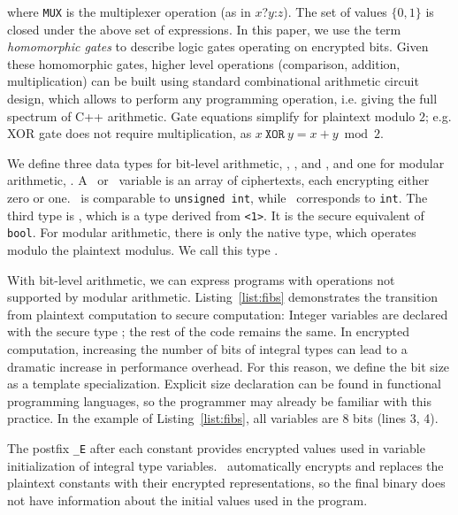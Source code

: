 \noindent where \texttt{MUX} is the multiplexer operation (as in {$x$?$y$:$z$}). The set of values $\{0,1\}$ is closed under the above set of expressions. 
In this paper, we use the term \emph{homomorphic gates} to describe logic gates operating on encrypted bits. Given these homomorphic gates, higher level operations (comparison, addition, multiplication) can be built using standard combinational arithmetic circuit design, which allows to perform any programming operation, i.e. giving the full spectrum of C++ arithmetic. Gate equations simplify for plaintext modulo $2$; e.g. XOR gate does not require multiplication, as \mbox{$x \ \texttt{XOR} \ y = x+y \bmod 2$}.

We define three data types for bit-level arithmetic, \secuint, \secint, and \secbool, and one for modular arithmetic, \secmod. 
A \secuint\ or \secint\ variable is an array of ciphertexts, each encrypting either zero or one. \secuint\ is comparable to \texttt{unsigned int}, while \secint\ corresponds to \texttt{int}.
The third type is \secbool, which is a type derived from \secuint\texttt{<1>}. It is the secure equivalent of \texttt{bool}.
For modular arithmetic, there is only the native type, which operates modulo the plaintext modulus. We call this type \secmod.

With bit-level arithmetic, we can express programs with operations not supported by modular arithmetic.
Listing~\ref{list:fibs} demonstrates the transition from plaintext computation to secure computation: Integer variables are declared with the secure type \secuint; the rest of the code remains the same.
In encrypted computation, increasing the number of bits of integral types can lead to a dramatic increase in performance overhead.
For this reason, we define the bit size as a template specialization.
Explicit size declaration can be found in functional programming languages, so the programmer may already be familiar with this practice.
In the example of Listing~\ref{list:fibs}, all variables are 8 bits (lines 3, 4).

The postfix {\tt{}\_E} after each constant provides encrypted values used in variable initialization of integral type variables.
\eee\ automatically encrypts and replaces the plaintext constants with their encrypted representations, so the final binary does not have information about the initial values used in the program. 




